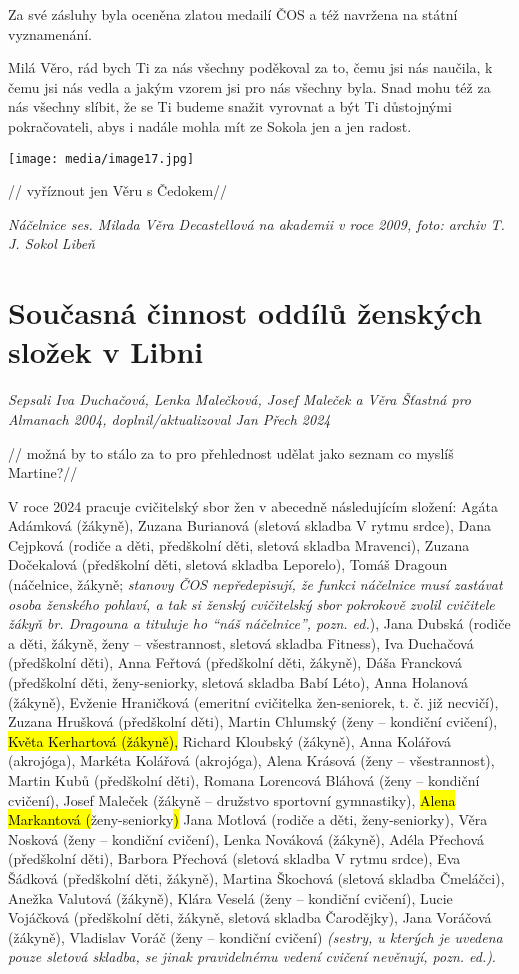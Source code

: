 Za své zásluhy byla oceněna zlatou medailí ČOS a též navržena na státní
vyznamenání.

Milá Věro, rád bych Ti za nás všechny poděkoval za to, čemu jsi nás
naučila, k čemu jsi nás vedla a jakým vzorem jsi pro nás všechny byla.
Snad mohu též za nás všechny slíbit, že se Ti budeme snažit vyrovnat a
být Ti důstojnými pokračovateli, abys i nadále mohla mít ze Sokola jen a
jen radost.

\texttt{[image: media/image17.jpg]}

// vyříznout jen Věru s Čedokem//

\emph{Náčelnice ses. Milada Věra Decastellová na akademii v roce 2009,
foto: archiv T. J. Sokol Libeň}

\section{Současná činnost oddílů ženských složek v
Libni}\label{souux10dasnuxe1-ux10dinnost-odduxedlux16f-ux17eenskuxfdch-sloux17eek-v-libni}

\emph{Sepsali Iva Duchačová, Lenka Malečková, Josef Maleček a Věra
Šťastná pro Almanach 2004, doplnil/aktualizoval Jan Přech 2024}

// možná by to stálo za to pro přehlednost udělat jako seznam co myslíš
Martine?//

V roce 2024 pracuje cvičitelský sbor žen v abecedně následujícím
složení: Agáta Adámková (žákyně), Zuzana Burianová (sletová skladba V
rytmu srdce), Dana Cejpková (rodiče a děti, předškolní děti, sletová
skladba Mravenci), Zuzana Dočekalová (předškolní děti, sletová skladba
Leporelo), Tomáš Dragoun (náčelnice, žákyně; \emph{stanovy ČOS
nepředepisují, že funkci náčelnice musí zastávat osoba ženského pohlaví,
a tak si ženský cvičitelský sbor pokrokově zvolil cvičitele žákyň br.
Dragouna a tituluje ho ``náš náčelnice'', pozn. ed.}), Jana Dubská
(rodiče a děti, žákyně, ženy -- všestrannost, sletová skladba Fitness),
Iva Duchačová (předškolní děti), Anna Feřtová (předškolní děti, žákyně),
Dáša Francková (předškolní děti, ženy-seniorky, sletová skladba Babí
Léto), Anna Holanová (žákyně), Evženie Hraničková (emeritní cvičitelka
žen-seniorek, t. č. již necvičí), Zuzana Hrušková (předškolní děti),
Martin Chlumský (ženy -- kondiční cvičení), \hl{Květa Kerhartová
(žákyně),} Richard Kloubský (žákyně), Anna Kolářová (akrojóga), Markéta
Kolářová (akrojóga), Alena Krásová (ženy -- všestrannost), Martin Kubů
(předškolní děti), Romana Lorencová Bláhová (ženy -- kondiční cvičení),
Josef Maleček (žákyně -- družstvo sportovní gymnastiky), \hl{Alena
Markantová (}ženy-seniorky\hl{)} Jana Motlová (rodiče a děti,
ženy-seniorky), Věra Nosková (ženy -- kondiční cvičení), Lenka Nováková
(žákyně), Adéla Přechová (předškolní děti), Barbora Přechová (sletová
skladba V rytmu srdce), Eva Šádková (předškolní děti, žákyně), Martina
Škochová (sletová skladba Čmeláčci), Anežka Valutová (žákyně), Klára
Veselá (ženy -- kondiční cvičení), Lucie Vojáčková (předškolní děti,
žákyně, sletová skladba Čarodějky), Jana Voráčová (žákyně), Vladislav
Voráč (ženy -- kondiční cvičení) \emph{(sestry, u kterých je uvedena
pouze sletová skladba, se jinak pravidelnému vedení cvičení nevěnují,
pozn. ed.)}.

